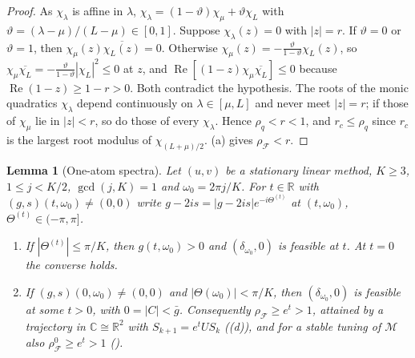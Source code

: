 \documentclass[11pt]{article}
\newtheorem{lemma}[theorem]{Lemma}
\theoremstyle{definition}
\theoremstyle{remark}
\newcommand{\R}{\mathbb R}
\newcommand{\C}{\mathbb C}
\newcommand{\cF}{\mathcal F}
\newcommand{\cM}{\mathcal M}
\newcommand{\Rea}{\operatorname{Re}}
\newcommand{\rhoF}{\rho_{\cF}}
\newcommand{\rhoz}{\rho_{\cF}^{0}}
\begin{document}
\begin{proof}
As \(\chi_\lambda\) is affine in \(\lambda\), \(\chi_\lambda=(1-\vartheta)\chi_\mu+\vartheta\chi_L\) with \(\vartheta=(\lambda-\mu)/(L-\mu)\in[0,1]\).  Suppose
\(\chi_\lambda(z)=0\) with \(|z|=r\).  If \(\vartheta=0\) or \(\vartheta=1\), then \(\chi_\mu(z)\overline{\chi_L(z)}=0\).  Otherwise
\(\chi_\mu(z)=-\frac\vartheta{1-\vartheta}\chi_L(z)\), so \(\chi_\mu\overline{\chi_L}=-\frac\vartheta{1-\vartheta}|\chi_L|^2\le0\) at \(z\), and
\(\Rea[(1-z)\chi_\mu\overline{\chi_L}]\le0\) because \(\Rea(1-z)\ge1-r>0\).  Both contradict the hypothesis.  The roots of the monic
quadratics \(\chi_\lambda\) depend continuously on \(\lambda\in[\mu,L]\) and never meet \(|z|=r\); if those of \(\chi_\mu\) lie in \(|z|<r\),
so do those of every \(\chi_\lambda\).  Hence \(\rho_q<r<1\), and \(r_c\le\rho_q\) since \(r_c\) is the largest root modulus of
\(\chi_{(L+\mu)/2}\).  (a) gives \(\rhoF<r\).
\end{proof}

\begin{lemma}[One-atom spectra]\label{lem:single}
Let \((u,v)\) be a stationary linear method, \(K\ge3\), \(1\le j<K/2\), \(\gcd(j,K)=1\) and \(\omega_0=2\pi j/K\).  For \(t\in\R\) with
\((g,s)(t,\omega_0)\ne(0,0)\) write \(g-2is=|g-2is|e^{-i\Theta^{(t)}}\) at \((t,\omega_0)\), \(\Theta^{(t)}\in(-\pi,\pi]\).
\begin{enumerate}[label=\textup{(\alph*)}]
\item If \(|\Theta^{(t)}|\le\pi/K\), then \(g(t,\omega_0)>0\) and \((\delta_{\omega_0},0)\) is feasible at \(t\).  At \(t=0\) the converse holds.
\item If \((g,s)(0,\omega_0)\ne(0,0)\) and \(|\Theta(\omega_0)|<\pi/K\), then \((\delta_{\omega_0},0)\) is feasible at some \(t>0\), with \(0=|C|<\bar g\).
Consequently \(\rhoF\ge e^t>1\), attained by a trajectory in \(\C\cong\R^2\) with \(S_{k+1}=e^tUS_k\) ((d)), and for a stable
tuning of \(\cM\) also \(\rhoz\ge e^t>1\) ().
\end{enumerate}
\end{lemma}
\end{document}

